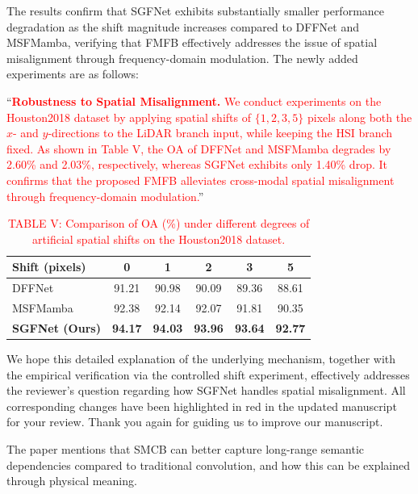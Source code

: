 The results confirm that SGFNet exhibits substantially smaller performance degradation as the shift magnitude increases compared to DFFNet and MSFMamba, verifying that FMFB effectively addresses the issue of spatial misalignment through frequency-domain modulation. The newly added experiments are as follows:

``\textbf{\textcolor{red}{Robustness to Spatial Misalignment.}} \textcolor{red}{We conduct experiments on the Houston2018 dataset by applying spatial shifts of $\{1, 2, 3, 5\}$ pixels along both the $x$- and $y$-directions to the LiDAR branch input, while keeping the HSI branch fixed. As shown in Table V, the OA of DFFNet and MSFMamba degrades by 2.60\% and 2.03\%, respectively, whereas SGFNet exhibits only 1.40\% drop. It confirms that the proposed FMFB alleviates cross-modal spatial misalignment through frequency-domain modulation.}''

\begin{table}[h]
  \centering
  \footnotesize
  \caption*{\textcolor{red}{\footnotesize TABLE V: Comparison of OA (\%) under different degrees of artificial spatial shifts on the Houston2018 dataset.}}
  \begin{tabular}{lccccc}
  \toprule
  Shift (pixels) & 0 & 1 & 2 & 3 & 5 \\
  \midrule
  DFFNet & 91.21 & 90.98 & 90.09 & 89.36 & 88.61 \\
  MSFMamba & 92.38 & 92.14 & 92.07 & 91.81 & 90.35 \\
  \rowcolor{bg} \textbf{SGFNet (Ours)} & \textbf{94.17} & \textbf{94.03} & \textbf{93.96} & \textbf{93.64} & \textbf{92.77} \\
  \bottomrule
  \end{tabular}
\end{table}




We hope this detailed explanation of the underlying mechanism, together with the empirical verification via the controlled shift experiment, effectively addresses the reviewer's question regarding how SGFNet handles spatial misalignment. All corresponding changes have been highlighted in red in the updated manuscript for your review. Thank you again for guiding us to improve our manuscript.

\vspace{2em}

\begin{tcolorbox}[title={Reviewer \#2, Comment \#3}] 
  \vspace{1em}

  \color{blue}
  The paper mentions that SMCB can better capture long-range semantic dependencies compared to traditional convolution, and how this can be explained through physical meaning.
  
  \vspace{1em}
\end{tcolorbox}

